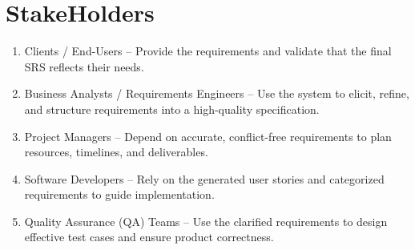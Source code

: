 \section{StakeHolders}
\begin{enumerate}
\item Clients / End-Users – Provide the requirements and validate that the final SRS reflects their needs.
\item Business Analysts / Requirements Engineers – Use the system to elicit, refine, and structure requirements into a high-quality specification.
\item Project Managers – Depend on accurate, conflict-free requirements to plan resources, timelines, and deliverables.
\item Software Developers – Rely on the generated user stories and categorized requirements to guide implementation.
\item Quality Assurance (QA) Teams – Use the clarified requirements to design effective test cases and ensure product correctness.
\end{enumerate}
